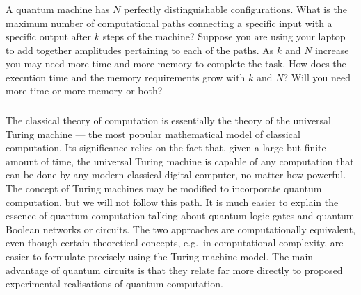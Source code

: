 \documentclass[fleqn]{article}
\begin{document}
\hypertarget{section-5}{%
\subsubsection{}\label{section-5}}

A quantum machine has \(N\) perfectly distinguishable configurations.
What is the maximum number of computational paths connecting a specific input with a specific output after \(k\) steps of the machine?
Suppose you are using your laptop to add together amplitudes pertaining to each of the paths.
As \(k\) and \(N\) increase you may need more time and more memory to complete the task.
How does the execution time and the memory requirements grow with \(k\) and \(N\)?
Will you need more time or more memory or both?

\hypertarget{section-6}{%
\subsubsection{}\label{section-6}}

The classical theory of computation is essentially the theory of the universal Turing machine --- the most popular mathematical model of classical computation.
Its significance relies on the fact that, given a large but finite amount of time, the universal Turing machine is capable of any computation that can be done by any modern classical digital computer, no matter how powerful.
The concept of Turing machines may be modified to incorporate quantum computation, but we will not follow this path.
It is much easier to explain the essence of quantum computation talking about quantum logic gates and quantum Boolean networks or circuits.
The two approaches are computationally equivalent, even though certain theoretical concepts, e.g.~in computational complexity, are easier to formulate precisely using the Turing machine model.
The main advantage of quantum circuits is that they relate far more directly to proposed experimental realisations of quantum computation.

\hypertarget{section-7}{%
\subsubsection{}\label{section-7}}
\end{document}
